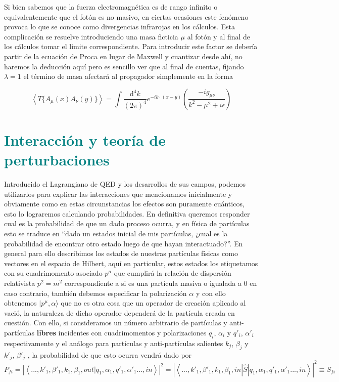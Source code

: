 \documentclass{article}
\numberwithin{equation}{section}
\begin{document}
Si bien sabemos que la fuerza electromagnética es de rango infinito o equivalentemente que el fotón es no masivo, en ciertas ocasiones este fenómeno provoca lo que se conoce como divergencias infrarojas en los cálculos. Esta complicación se resuelve introduciendo una masa ficticia $ \mu $ al fotón y al final de los cálculos tomar el limite correspondiente. Para introducir este factor se debería partir de la ecuación de Proca en lugar de Maxwell y cuantizar desde ahí, no haremos la deducción aquí pero es sencillo ver que al final de cuentas, fijando $ \lambda=1 $ el término de masa afectará al propagador simplemente en la forma

\begin{equation}\label{prop_fotonmu}
\left\langle T\{A_{\mu}(x)A_{\nu}(y)\} \right\rangle =\int\frac{\mathrm{d^4}k}{(2\pi)^{4}}e^{-ik\cdot(x-y)}\left(\frac{-ig_{\mu\nu}}{k^2 -\mu^2 +i\epsilon}\right)
\end{equation} 

\section{\textcolor{teal}{Interacción y teoría de perturbaciones}}

Introducido el Lagrangiano de QED y los desarrollos de sus campos, podemos utilizarlos para explicar
las interacciones que mencionamos inicialmente y obviamente como en
estas circunstancias los efectos son puramente cuánticos, esto lo
lograremos calculando probabilidades. En definitiva queremos responder
cual es la probabilidad de que un dado proceso ocurra, y en física
de partículas esto se traduce en ``dado un estados inicial de mis
partículas, ¿cual es la probabilidad de encontrar otro estado luego
de que hayan interactuado?''. En general para ello describimos los
estados de nuestras partículas físicas como vectores en el espacio
de Hilbert, aquí en particular, estos estados los etiquetamos con
su cuadrimomento asociado $p^{\mu}$ que cumplirá la relación de dispersión
relativista $p^{2}=m^{2}$ correspondiente a si es una partícula masiva
o igualada a $ 0 $ en caso contrario, también debemos especificar la polarización $\alpha$
y con ello obtenemos $|p^{\mu},\alpha \rangle$ que no es otra cosa que un
operador de creación aplicado al vació, la naturaleza de dicho operador
dependerá de la partícula creada en cuestión. Con ello, si consideramos
un número arbitrario de partículas y anti-partículas \textbf{libres
}incidentes con cuadrimomentos y polarizaciones $q_{i}$, $\alpha_{i}$
y $q'_{i}$, $\alpha'_{i}$ respectivamente y el análogo para partículas
y anti-partículas salientes $k_{j}$, $\beta_{j}$
y $k'_{j}$, $\beta'_{j}$ , la probabilidad de que esto ocurra vendrá
dado por
\begin{equation}
P_{fi}=\left|\left\langle ...,k'_{1},\beta'_{1},k_{1},\beta_{1},out|q_{1},\alpha_{1},q'_{1},\alpha'_{1}...,in\right\rangle \right|^{2}=\left|\left\langle ...,k'_{1},\beta'_{1},k_{1},\beta_{1},in|\hat{S}|q_{1},\alpha_{1},q'_{1},\alpha'_{1}...,in\right\rangle \right|^{2}\equiv S_{fi}
\end{equation}
\end{document}
